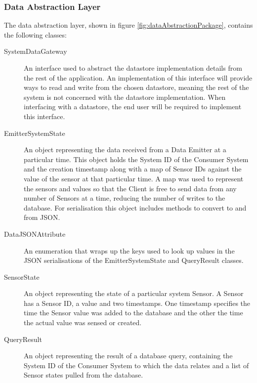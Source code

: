 \documentclass[10pt,a4paper]{article}
\begin{document}
\subsubsection*{Data Abstraction Layer}

The data abstraction layer, shown in figure
\ref{fig:dataAbstractionPackage}, contains the following classes:

\begin{description}
  \item [SystemDataGateway] An interface used to abstract the
    datastore implementation details from the rest of the
    application. An implementation of this interface will provide ways
    to read and write from the chosen datastore, meaning the rest of the
    system is not concerned with the datastore implementation. When
    interfacing with a datastore, the end user will be required to
    implement this interface.

  \item [EmitterSystemState] An object representing the data received
    from a Data Emitter at a particular time. This object holds
    the System ID of the Consumer System and the creation timestamp along
    with a map of Sensor IDs against the value of the sensor at that
    particular time. A map was used to represent the sensors and
    values so that the Client is free to send data from any number of 
    Sensors at a time, reducing the number of writes to the
    database. For serialisation this object includes methods to
    convert to and from JSON.

  \item [DataJSONAttribute] An enumeration that wraps up the keys used
    to look up values in the JSON serialisations of the
    EmitterSystemState and QueryResult classes.

  \item [SensorState] An object representing the state of a particular
    system Sensor. A Sensor has a Sensor ID, a value and two timestamps. One
    timestamp specifies the time the Sensor value was added to the database and
    the other the time the actual value was sensed or created.

  \item [QueryResult] An object representing the result of a database
    query, containing the System ID of the Consumer System to which the
    data relates and a list of Sensor states pulled from the database.
\end{description}
\end{document}
